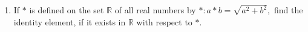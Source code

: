 
\begin{enumerate}

 \item If $*$ is defined on the set $\mathbb{R}$ of all real numbers by $* : a * b = \sqrt{a^2+b^2} ,$ find the identity element, if it exists in $\mathbb{R}$ with respect to $*$.

 \end{enumerate}

